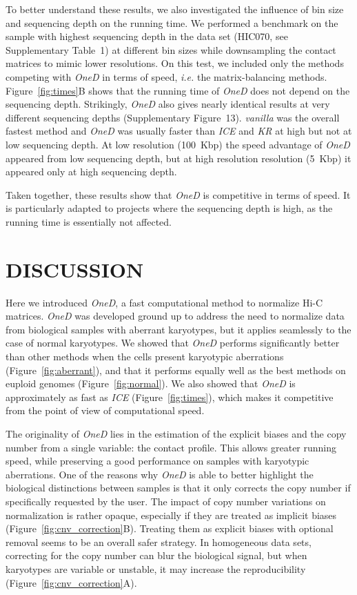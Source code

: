 \documentclass[a4,center,fleqn]{NAR}
\begin{document}
To better understand these results, we also investigated the influence of
bin size and sequencing depth on the running time. We performed a
benchmark on the sample with highest sequencing depth in the data set
(HIC070, see Supplementary Table~1) at different bin sizes while
downsampling the contact matrices to mimic lower resolutions. On this
test, we included only the methods competing with \textit{OneD} in terms
of speed, \textit{i.e.} the matrix-balancing methods.
Figure~\ref{fig:times}B shows that the running time of \textit{OneD} does
not depend on the sequencing depth. Strikingly, \textit{OneD} also gives
nearly identical results at very different sequencing depths
(Supplementary Figure~13). \textit{vanilla} was the overall fastest method
and \textit{OneD} was usually faster than \textit{ICE} and \textit{KR}
at high but not at low sequencing depth. At low resolution (100~Kbp) the
speed advantage of \textit{OneD} appeared from low sequencing depth, but
at high resolution resolution (5~Kbp) it appeared only at high sequencing
depth.

Taken together, these results show that \textit{OneD} is competitive in
terms of speed. It is particularly adapted to projects where the
sequencing depth is high, as the running time is essentially not affected.



\section{DISCUSSION}

Here we introduced \textit{OneD}, a fast computational method to normalize
Hi-C matrices. \textit{OneD} was developed ground up to address the need
to normalize data from biological samples with aberrant karyotypes, but it
applies seamlessly to the case of normal karyotypes. We showed that
\textit{OneD} performs significantly better than other methods when the
cells present karyotypic aberrations (Figure~\ref{fig:aberrant}), and that
it performs equally well as the best methods on euploid genomes
(Figure~\ref{fig:normal}). We also showed that \textit{OneD} is
approximately as fast as \textit{ICE} (Figure~\ref{fig:times}), which
makes it competitive from the point of view of computational speed.

The originality of \textit{OneD} lies in the estimation of the explicit
biases and the copy number from a single variable: the contact profile.
This allows greater running speed, while preserving a good performance on
samples with karyotypic aberrations. One of the reasons why \textit{OneD}
is able to better highlight the biological distinctions between samples is
that it only corrects the copy number if specifically requested by the
user. The impact of copy number variations on normalization is rather
opaque, especially if they are treated as implicit biases
(Figure~\ref{fig:cnv_correction}B). Treating them as explicit biases with
optional removal seems to be an overall safer strategy. In homogeneous
data sets, correcting for the copy number can blur the biological signal,
but when karyotypes are variable or unstable, it may increase the
reproducibility (Figure~\ref{fig:cnv_correction}A).
\end{document}

